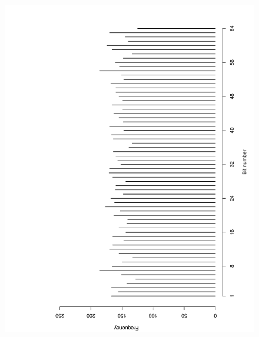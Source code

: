 \documentclass[10pt]{article}
\begin{document}
\begin{figure}[ht]
{  \includegraphics[scale=0.25,angle=-90,clip]{fig02}
  }
\end{figure}
\end{document}

